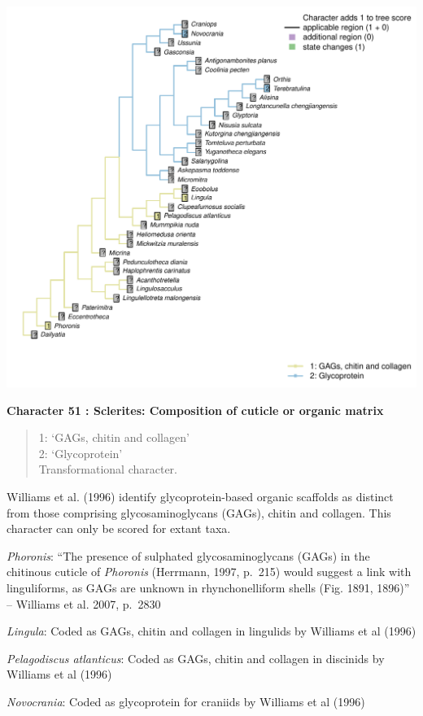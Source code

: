 \documentclass[]{book}
\theoremstyle{definition}
\theoremstyle{definition}
\theoremstyle{definition}
\theoremstyle{remark}
\begin{document}
\includegraphics{Brachiopod_phylogeny_files/figure-latex/unnamed-chunk-5-51.pdf}

\textbf{Character 51 : Sclerites: Composition of cuticle or organic
matrix }

\begin{quote}
1: `GAGs, chitin and collagen'\\
2: `Glycoprotein'\\
Transformational character.
\end{quote}

Williams et al. (1996) identify glycoprotein-based organic scaffolds as
distinct from those comprising glycosaminoglycans (GAGs), chitin and
collagen. This character can only be scored for extant taxa.

\emph{Phoronis}: ``The presence of sulphated glycosaminoglycans (GAGs)
in the chitinous cuticle of \emph{Phoronis} (Herrmann, 1997, p.~215)
would suggest a link with linguliforms, as GAGs are unknown in
rhynchonelliform shells (Fig. 1891, 1896)'' -- Williams et al. 2007,
p.~2830

\emph{Lingula}: Coded as GAGs, chitin and collagen in lingulids by
Williams et al (1996)

\emph{Pelagodiscus atlanticus}: Coded as GAGs, chitin and collagen in
discinids by Williams et al (1996)

\emph{Novocrania}: Coded as glycoprotein for craniids by Williams et al
(1996)
\end{document}

